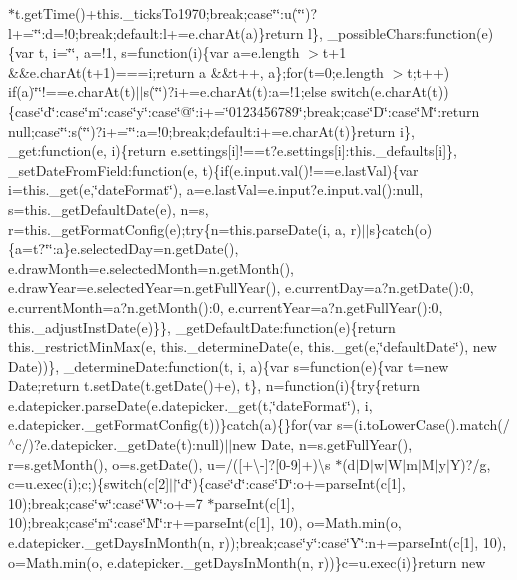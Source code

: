 {{\begin{DoxyParamCaption}
$\ast$t.\+get\+Time()+this.\+\_\+ticks\+To1970;break;case\char`\"{}\textquotesingle{}\char`\"{}\+:u(\char`\"{}\textquotesingle{}\char`\"{})?l+=\char`\"{}\textquotesingle{}\char`\"{}\+:d=!0;break;default\+:l+=e.\+char\+At(a)\}return l\}, \+\_\+possible\+Chars\+:function(e)\{var t, i=\char`\"{}\char`\"{}, a=!1, s=function(i)\{var a=e.\+length $>$t+1 \&\&e.\+char\+At(t+1)===i;return a \&\&t++, a\};for(t=0;e.\+length $>$t;t++) if(a)\char`\"{}\textquotesingle{}\char`\"{}!==e.\+char\+At(t)$\vert$$\vert$s(\char`\"{}\textquotesingle{}\char`\"{})?i+=e.\+char\+At(t)\+:a=!1;else switch(e.\+char\+At(t))\{case\char`\"{}d\char`\"{}\+:case\char`\"{}m\char`\"{}\+:case\char`\"{}y\char`\"{}\+:case\char`\"{}@\char`\"{}\+:i+=\char`\"{}0123456789\char`\"{};break;case\char`\"{}\+D\char`\"{}\+:case\char`\"{}\+M\char`\"{}\+:return null;case\char`\"{}\textquotesingle{}\char`\"{}\+:s(\char`\"{}\textquotesingle{}\char`\"{})?i+=\char`\"{}\textquotesingle{}\char`\"{}\+:a=!0;break;default\+:i+=e.\+char\+At(t)\}return i\}, \+\_\+get\+:function(e, i)\{return e.\+settings\mbox{[}i\mbox{]}!==t?e.\+settings\mbox{[}i\mbox{]}\+:this.\+\_\+defaults\mbox{[}i\mbox{]}\}, \+\_\+set\+Date\+From\+Field\+:function(e, t)\{if(e.\+input.\+val()!==e.\+last\+Val)\{var i=this.\+\_\+get(e,\char`\"{}date\+Format\char`\"{}), a=e.\+last\+Val=e.\+input?e.\+input.\+val()\+:null, s=this.\+\_\+get\+Default\+Date(e), n=s, r=this.\+\_\+get\+Format\+Config(e);try\{n=this.\+parse\+Date(i, a, r)$\vert$$\vert$s\}catch(o)\{a=t?\char`\"{}\char`\"{}\+:a\}e.\+selected\+Day=n.\+get\+Date(), e.\+draw\+Month=e.\+selected\+Month=n.\+get\+Month(), e.\+draw\+Year=e.\+selected\+Year=n.\+get\+Full\+Year(), e.\+current\+Day=a?n.\+get\+Date()\+:0, e.\+current\+Month=a?n.\+get\+Month()\+:0, e.\+current\+Year=a?n.\+get\+Full\+Year()\+:0, this.\+\_\+adjust\+Inst\+Date(e)\}\}, \+\_\+get\+Default\+Date\+:function(e)\{return this.\+\_\+restrict\+Min\+Max(e, this.\+\_\+determine\+Date(e, this.\+\_\+get(e,\char`\"{}default\+Date\char`\"{}), new Date))\}, \+\_\+determine\+Date\+:function(t, i, a)\{var s=function(e)\{var t=new Date;return t.\+set\+Date(t.\+get\+Date()+e), t\}, n=function(i)\{try\{return e.\+datepicker.\+parse\+Date(e.\+datepicker.\+\_\+get(t,\char`\"{}date\+Format\char`\"{}), i, e.\+datepicker.\+\_\+get\+Format\+Config(t))\}catch(a)\{\}for(var s=(i.\+to\+Lower\+Case().\+match(/$^\wedge$c/)?e.\+datepicker.\+\_\+get\+Date(t)\+:null)$\vert$$\vert$new Date, n=s.\+get\+Full\+Year(), r=s.\+get\+Month(), o=s.\+get\+Date(), u=/(\mbox{[}+\textbackslash{}-\/\mbox{]}?\mbox{[}0-\/9\mbox{]}+)\textbackslash{}s $\ast$(d$\vert$\+D$\vert$w$\vert$\+W$\vert$m$\vert$\+M$\vert$y$\vert$\+Y)?/g, c=u.\+exec(i);c;)\{switch(c\mbox{[}2\mbox{]}$\vert$$\vert$\char`\"{}d\char`\"{})\{case\char`\"{}d\char`\"{}\+:case\char`\"{}\+D\char`\"{}\+:o+=parse\+Int(c\mbox{[}1\mbox{]}, 10);break;case\char`\"{}w\char`\"{}\+:case\char`\"{}\+W\char`\"{}\+:o+=7 $\ast$parse\+Int(c\mbox{[}1\mbox{]}, 10);break;case\char`\"{}m\char`\"{}\+:case\char`\"{}\+M\char`\"{}\+:r+=parse\+Int(c\mbox{[}1\mbox{]}, 10), o=\+Math.\+min(o, e.\+datepicker.\+\_\+get\+Days\+In\+Month(n, r));break;case\char`\"{}y\char`\"{}\+:case\char`\"{}\+Y\char`\"{}\+:n+=parse\+Int(c\mbox{[}1\mbox{]}, 10), o=\+Math.\+min(o, e.\+datepicker.\+\_\+get\+Days\+In\+Month(n, r))\}c=u.\+exec(i)\}return new 
\end{DoxyParamCaption}}}
